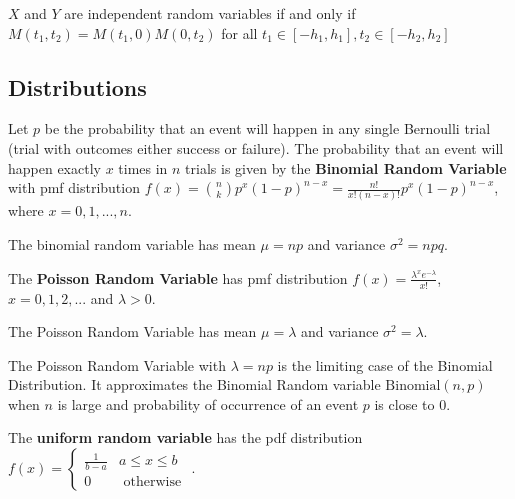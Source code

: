\begin{thm}
    $X$ and $Y$ are independent random variables if and only if $M(t_1, t_2) = M(t_1, 0) M(0, t_2)$ for all $t_1 \in [-h_1, h_1], t_2 \in [-h_2, h_2]$
\end{thm}


\subsection*{Distributions}

\begin{defn}
    Let $p$ be the probability that an event will happen in any single Bernoulli trial (trial with outcomes either success or failure). The probability that an event will happen exactly $x$ times in $n$ trials is given by the \textbf{Binomial Random Variable} with pmf distribution $f(x) = {n \choose k} p^x (1-p)^{n-x} = \displaystyle \frac{n!}{x! (n-x)!} p^x (1-p)^{n-x}$, where $x = 0, 1, ... , n$.
\end{defn}

\begin{prop}
The binomial random variable has mean $\mu = np$ and variance $\sigma^2 = npq$.
\end{prop}

\begin{defn}
    The \textbf{Poisson Random Variable} has pmf distribution $f(x) = \displaystyle \frac{\lambda^x e^{-\lambda}}{x!}$, $x = 0, 1, 2, ...$ and $\lambda > 0$.
\end{defn}

\begin{prop}
The Poisson Random Variable has mean $\mu = \lambda$ and variance $\sigma^2 = \lambda$.
\end{prop}
\begin{prop}
    The Poisson Random Variable with $\lambda = np$ is the limiting case of the Binomial Distribution. It approximates the Binomial Random variable $\text{Binomial}(n,p)$ when $n$ is large and probability of occurrence of an event $p$ is close to $0$.
\end{prop}

\begin{defn}    
    The \textbf{uniform random variable} has the pdf distribution $f(x) = \begin{cases} \frac{1}{b-a} & a \leq x \leq b \\ 0 & \text { otherwise }\end{cases}$.
\end{defn}


